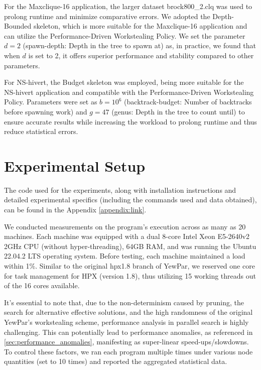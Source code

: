 \documentclass{mproj}
\begin{document}
For the Maxclique-16 application, the larger dataset brock800\_2.clq was used to prolong runtime and minimize comparative errors.
We adopted the Depth-Bounded skeleton, which is more suitable for the Maxclique-16 application and can utilize the Performance-Driven Workstealing Policy.
We set the parameter \(d = 2\) (spawn-depth: Depth in the tree to spawn at) as, in practice, we found that when \(d\) is set to 2, it offers superior performance and stability compared to other parameters.

For NS-hivert, the Budget skeleton was employed, being more suitable for the NS-hivert application and compatible with the Performance-Driven Workstealing Policy.
Parameters were set as \(b = 10^6\) (backtrack-budget: Number of backtracks before spawning work) and \(g = 47\) (genus: Depth in the tree to count until) to ensure accurate results while increasing the workload to prolong runtime and thus reduce statistical errors.

\section{Experimental Setup}

The code used for the experiments,
along with installation instructions and detailed experimental specifics (including the commands used and data obtained),
can be found in the Appendix \ref{appendix:link}.

We conducted measurements on the program's execution across as many as 20 machines.
Each machine was equipped with a dual 8-core Intel Xeon E5-2640v2 2GHz CPU (without hyper-threading),
64GB RAM, and was running the Ubuntu 22.04.2 LTS operating system.
Before testing, each machine maintained a load within 1\%.
Similar to the original hpx1.8 branch of YewPar, we reserved one core for task management for HPX (version 1.8),
thus utilizing 15 working threads out of the 16 cores available.

It's essential to note that, due to the non-determinism caused by pruning, the search for alternative effective solutions, and the high randomness of the original YewPar's workstealing scheme,
performance analysis in parallel search is highly challenging.
This can potentially lead to performance anomalies, as referenced in \ref{sec:performance_anomalies},
manifesting as super-linear speed-ups/slowdowns.
To control these factors,
we ran each program multiple times under various node quantities (set to 10 times)
and reported the aggregated statistical data.
\end{document}

